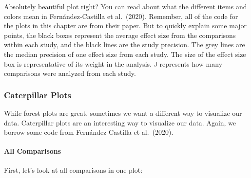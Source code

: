 \documentclass[
]{book}
\begin{document}
Absolutely beautiful plot right? You can read about what the different items and colors mean in Fernández-Castilla et al.~(2020)\citep{fernández-castilla2020}. Remember, all of the code for the plots in this chapter are from their paper. But to quickly explain some major points, the black boxes represent the average effect size from the comparisons within each study, and the black lines are the study precision. The grey lines are the median precision of one effect size from each study. The size of the effect size box is representative of its weight in the analysis. J represents how many comparisons were analyzed from each study.

\hypertarget{caterpillar-plots}{%
\subsubsection{Caterpillar Plots}\label{caterpillar-plots}}

While forest plots are great, sometimes we want a different way to visualize our data. Caterpillar plots are an interesting way to visualize our data. Again, we borrow some code from Fernández-Castilla et al.~(2020)\citep{fernández-castilla2020}.

\hypertarget{all-comparisons}{%
\paragraph{All Comparisons}\label{all-comparisons}}

First, let's look at all comparisons in one plot:
\end{document}
